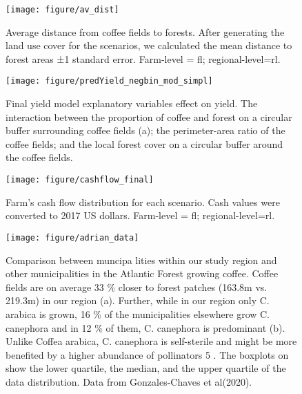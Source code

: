 \documentclass[
	12pt,				%
	oneside,			%
	a4paper,			%
	chapter=TITLE,		%
	section=TITLE,		%
	brazil,			%
	english				%
	]{abntex2}
\begin{document}
\begin{figure}[H]

{\centering \texttt{[image: figure/av\_dist]} 

}

\caption{Average distance from coffee fields to forests. After generating the land use cover for the scenarios, we calculated the mean distance to forest areas ±1 standard error. Farm-level = fl; regional-level=rl.}\label{fig:figureb4}
\end{figure}
\begin{figure}[H]

{\centering \texttt{[image: figure/predYield\_negbin\_mod\_simpl]} 

}

\caption{Final yield model explanatory variables effect on yield. The interaction between the proportion of coffee and forest on a circular buffer surrounding coffee fields (a); the perimeter-area ratio of the coffee fields; and the local forest cover on a circular buffer around the coffee fields.}\label{fig:figureb5}
\end{figure}
\begin{figure}[H]

{\centering \texttt{[image: figure/cashflow\_final]} 

}

\caption{Farm’s cash flow distribution for each scenario. Cash values were converted to 2017 US dollars. Farm-level = fl; regional-level=rl.}\label{fig:figureb6}
\end{figure}
\begin{figure}[H]

{\centering \texttt{[image: figure/adrian\_data]} 

}

\caption{Comparison between muncipa lities within our study region and other municipalities in the Atlantic Forest growing coffee. Coffee fields are on average 33 \% closer to forest patches (163.8m vs. 219.3m) in our region (a). Further, while in our region only C. arabica is grown, 16 \% of the municipalities elsewhere grow C. canephora and in 12 \% of them, C. canephora is predominant (b). Unlike Coffea arabica, C. canephora is self-sterile and might be more benefited by a higher abundance of pollinators 5 . The boxplots on show the lower quartile, the median, and the upper quartile of the data distribution.  Data from Gonzales-Chaves et al(2020). }\label{fig:figureb7}
\end{figure}
\newpage
\end{document}
